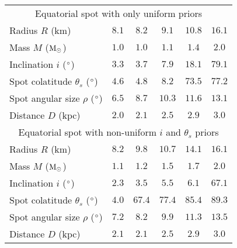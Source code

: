\documentclass{wihuri}
\def\msun{{\rm M_{\odot}}}
\def\thetas{\theta_{s}}
\begin{document}
\begin{center}
\begin{table*}
\begin{footnotesize}
\begin{center}
\begin{adjustwidth}{-3cm}{}
\begin{tabular}[c]{l c c c c c}
      \multicolumn{6}{c}{Equatorial spot with only uniform priors} \\ %
      Radius $R$ (km) & $8.1$ & $8.2$ & $9.1$ & $10.8$ & $16.1$  \\ %
      Mass $M$ ($\msun$) & $1.0$ & $1.0$ & $1.1$ & $1.4$ & $2.0$  \\ %
      Inclination $i$ ($\degree$) & $3.3$ & $3.7$ & $7.9$ & $18.1$ & $79.1$ \\ %
      Spot colatitude $\thetas$ ($\degree$) & $4.6$ & $4.8$ & $8.2$ & $73.5$ & $77.2$ \\ %
      Spot angular size $\rho$ ($\degree$) & $6.5$ & $8.7$ & $10.3$ & $11.6$ & $13.1$ \\ %
      Distance $D$ (kpc) &  $2.0$ & $2.1$ & $2.5$ & $2.9$ & $3.0$ \\ \hline
      
      \multicolumn{6}{c}{Equatorial spot with non-uniform $i$ and $\thetas$ priors} \\ %
      Radius $R$ (km) & $8.2$ & $9.8$ & $10.7$ & $14.1$ & $16.1$  \\ %
      Mass $M$ ($\msun$) & $1.1$ & $1.2$ & $1.5$ & $1.7$ & $2.0$  \\ %
      Inclination $i$ ($\degree$) & $2.3$ & $3.5$ & $5.5$ & $6.1$ & $67.1$ \\ %
      Spot colatitude $\thetas$ ($\degree$) & $4.0$ & $67.4$ & $77.4$ & $85.4$ & $89.3$ \\ %
      Spot angular size $\rho$ ($\degree$) & $7.2$ & $8.2$ & $9.9$ & $11.3$ & $13.5$ \\ %
      Distance $D$ (kpc) & $2.1$ & $2.1$ & $2.5$ & $2.9$ & $3.0$ \\ 


    \hline
  \end{tabular}
    \end{adjustwidth}
  \end{center} 
  \end{footnotesize}
  \end{table*}
\end{center} 
\end{document}
